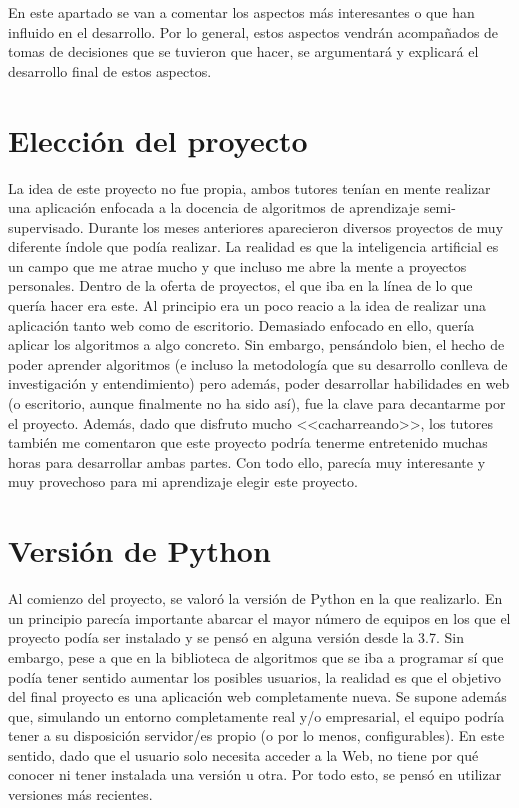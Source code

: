 
En este apartado se van a comentar los aspectos más interesantes o que han
influido en el desarrollo. Por lo general, estos aspectos vendrán acompañados de
tomas de decisiones que se tuvieron que hacer, se argumentará y explicará el
desarrollo final de estos aspectos.

\section{Elección del proyecto}

La idea de este proyecto no fue propia, ambos tutores tenían en mente realizar
una aplicación enfocada a la docencia de algoritmos de aprendizaje
semi-supervisado. Durante los meses anteriores aparecieron diversos proyectos de
muy diferente índole que podía realizar. La realidad es que la inteligencia
artificial es un campo que me atrae mucho y que incluso me abre la mente a
proyectos personales. Dentro de la oferta de proyectos, el que iba en la línea
de lo que quería hacer era este. Al principio era un poco reacio a la idea de
realizar una aplicación tanto web como de escritorio. Demasiado enfocado en
ello, quería aplicar los algoritmos a algo concreto. Sin embargo, pensándolo
bien, el hecho de poder aprender algoritmos (e incluso la metodología que su
desarrollo conlleva de investigación y entendimiento) pero además, poder
desarrollar habilidades en web (o escritorio, aunque finalmente no ha sido así),
fue la clave para decantarme por el proyecto. Además, dado que disfruto mucho
<<cacharreando>>, los tutores también me comentaron que este proyecto podría
tenerme entretenido muchas horas para desarrollar ambas partes. Con todo ello,
parecía muy interesante y muy provechoso para mi aprendizaje elegir este
proyecto.

\section{Versión de Python}

Al comienzo del proyecto, se valoró la versión de Python en la que realizarlo.
En un principio parecía importante abarcar el mayor número de equipos en los que
el proyecto podía ser instalado y se pensó en alguna versión desde la 3.7. Sin
embargo, pese a que en la biblioteca de algoritmos que se iba a programar sí que
podía tener sentido aumentar los posibles usuarios, la realidad es que el
objetivo del final proyecto es una aplicación web completamente nueva. Se supone
además que, simulando un entorno completamente real y/o empresarial, el equipo
podría tener a su disposición servidor/es propio (o por lo menos,
configurables). En este sentido, dado que el usuario solo necesita acceder a la
Web, no tiene por qué conocer ni tener instalada una versión u otra. Por todo
esto, se pensó en utilizar versiones más recientes. 

